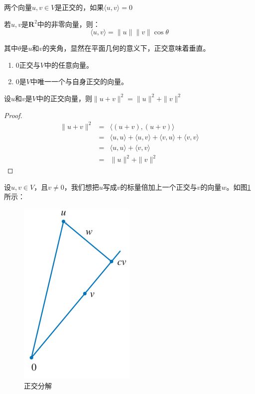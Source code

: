 \documentclass[10pt,a4paper,UTF8]{article}
\begin{document}
\begin{definition}
两个向量\(u,v\in V\)是正交的，如果\(\langle u,v \rangle  = 0\)
\end{definition}

若\(u,v\)是\(\mathbf{R}^{2}\)中的非零向量，则：
\begin{equation}
\label{eq:9}
\langle u,v \rangle = \| u \| \| v\|\cos \theta
\end{equation}

其中\(\theta\)是\(u\)和\(v\)的夹角，显然在平面几何的意义下，正交意味着垂直。

\begin{theorem}
\begin{enumerate}
\item \(0\)正交与\(V\)中的任意向量。
\item \(0\)是\(V\)中唯一一个与自身正交的向量。
\end{enumerate}
\end{theorem}

\begin{theorem}
设\(u\)和\(v\)是\(V\)中的正交向量，则\(\| u+v \|^{2} = \| u \|^{2} + \| v \|^{2}\)
\end{theorem}

\begin{proof}
\begin{eqnarray}
\label{eq:10}
\| u+v \|^{2} &=& \langle (u+v),(u+v) \rangle  \\
&=& \langle u,u \rangle  + \langle u,v \rangle  + \langle v,u \rangle + \langle v,v \rangle \\
&=& \langle u,u \rangle  + \langle v,v \rangle \\
&=& \| u \|^{2} + \| v \|^{2}
\end{eqnarray}
\end{proof}

设\(u,v\in V\)，且\(v\neq 0\)，我们想把\(u\)写成\(v\)的标量倍加上一个正交与\(v\)的向量\(w\)。如图\ref{fig:orge90be60}所示：
\begin{figure}[htbp]
\centering
\includegraphics[width=0.5\textwidth]{../../img/math_ladr/20170514orthogonalDecomposition.png}
\caption{\label{fig:orge90be60}
正交分解}
\end{figure}
\end{document}
